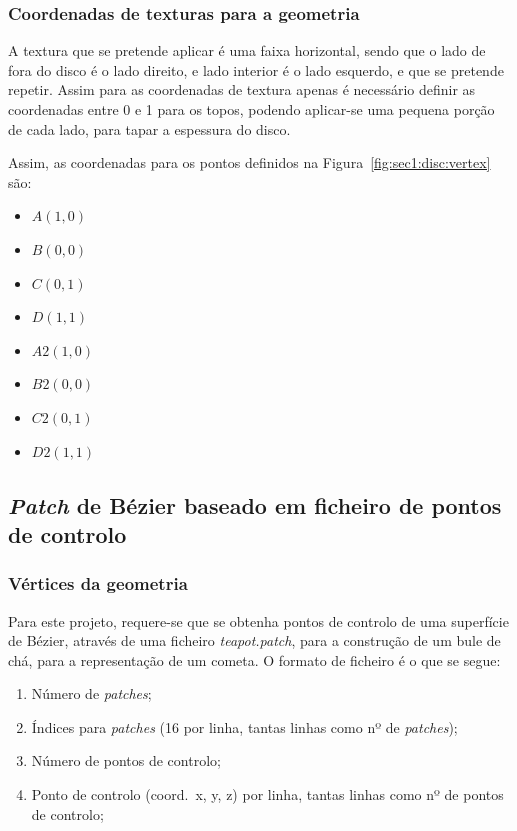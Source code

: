\subsubsection{Coordenadas de texturas para a geometria}

A textura que se pretende aplicar é uma faixa horizontal, sendo que o lado de
fora do disco é o lado direito, e lado interior é o lado esquerdo, e que se
pretende repetir. Assim para as coordenadas de textura apenas é necessário
definir as coordenadas entre 0 e 1 para os topos, podendo aplicar-se uma pequena
porção de cada lado, para tapar a espessura do disco.

Assim, as coordenadas para os pontos definidos na
Figura~\ref{fig:sec1:disc:vertex} são:

\begin{itemize}

\item $A(1, 0)$
\item $B(0, 0)$
\item $C(0, 1)$
\item $D(1, 1)$
\item $A2(1, 0)$
\item $B2(0, 0)$
\item $C2(0, 1)$
\item $D2(1, 1)$

\end{itemize}


\subsection{\emph{Patch} de Bézier baseado em ficheiro de pontos de controlo}

\subsubsection{Vértices da geometria}

Para este projeto, requere-se que se obtenha pontos de controlo de uma
superfície de Bézier, através de uma ficheiro \emph{teapot.patch}, para
a construção de um bule de chá, para a representação de um cometa. O formato de
ficheiro é o que se segue:
\begin{enumerate}
	\item Número de \emph{patches};
	\item Índices para \emph{patches} (16 por linha, tantas linhas como nº de
		\emph{patches});
	\item Número de pontos de controlo;
	\item Ponto de controlo (coord.\ x, y, z) por linha, tantas linhas como nº de
		pontos de controlo;
\end{enumerate}



